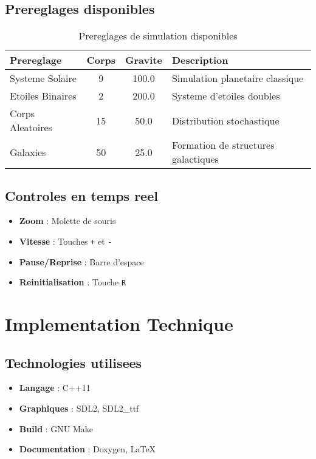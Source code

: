 \documentclass[12pt,a4paper]{article}
\begin{document}
\subsection{Prereglages disponibles}

\begin{table}[h]
\centering
\begin{tabular}{|l|c|c|l|}
\hline
\textbf{Prereglage} & \textbf{Corps} & \textbf{Gravite} & \textbf{Description} \\
\hline
Systeme Solaire & 9 & 100.0 & Simulation planetaire classique \\
Etoiles Binaires & 2 & 200.0 & Systeme d'etoiles doubles \\
Corps Aleatoires & 15 & 50.0 & Distribution stochastique \\
Galaxies & 50 & 25.0 & Formation de structures galactiques \\
\hline
\end{tabular}
\caption{Prereglages de simulation disponibles}
\end{table}

\subsection{Controles en temps reel}

\begin{itemize}
    \item \textbf{Zoom} : Molette de souris
    \item \textbf{Vitesse} : Touches \texttt{+} et \texttt{-}
    \item \textbf{Pause/Reprise} : Barre d'espace
    \item \textbf{Reinitialisation} : Touche \texttt{R}
\end{itemize}

\section{Implementation Technique}

\subsection{Technologies utilisees}

\begin{itemize}
    \item \textbf{Langage} : C++11
    \item \textbf{Graphiques} : SDL2, SDL2\_ttf
    \item \textbf{Build} : GNU Make
    \item \textbf{Documentation} : Doxygen, LaTeX
\end{itemize}
\end{document}
